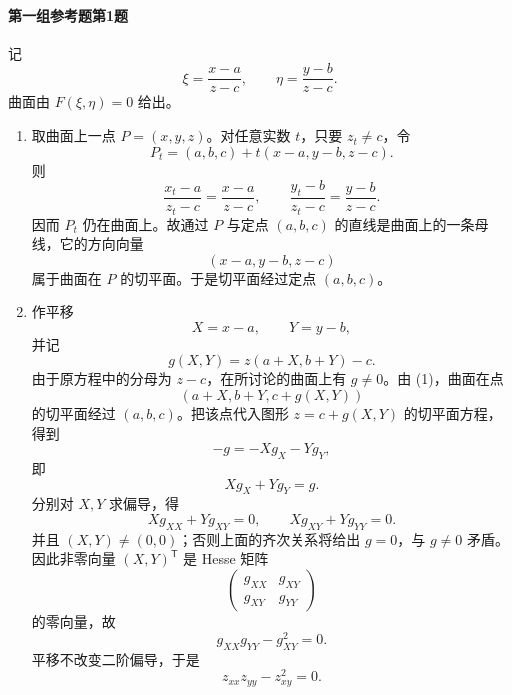 \paragraph{第一组参考题第1题}
\begin{xsolution}
记
\[
  \xi=\frac{x-a}{z-c},
  \qquad
  \eta=\frac{y-b}{z-c}.
\]
曲面由 $F(\xi,\eta)=0$ 给出。

\begin{enumerate}[label=(\arabic*)]
  \item 取曲面上一点 $P=(x,y,z)$。对任意实数 $t$，只要 $z_t\ne c$，令
  \[
    P_t=(a,b,c)+t(x-a,y-b,z-c).
  \]
  则
  \[
    \frac{x_t-a}{z_t-c}=\frac{x-a}{z-c},
    \qquad
    \frac{y_t-b}{z_t-c}=\frac{y-b}{z-c}.
  \]
  因而 $P_t$ 仍在曲面上。故通过 $P$ 与定点 $(a,b,c)$ 的直线是曲面上的一条母线，它的方向向量
  \[
    (x-a,y-b,z-c)
  \]
  属于曲面在 $P$ 的切平面。于是切平面经过定点 $(a,b,c)$。

  \item 作平移
  \[
    X=x-a,\qquad Y=y-b,
  \]
  并记
  \[
    g(X,Y)=z(a+X,b+Y)-c.
  \]
  由于原方程中的分母为 $z-c$，在所讨论的曲面上有 $g\ne0$。由 (1)，曲面在点
  \[
    (a+X,b+Y,c+g(X,Y))
  \]
  的切平面经过 $(a,b,c)$。把该点代入图形 $z=c+g(X,Y)$ 的切平面方程，得到
  \[
    -g=-Xg_X-Yg_Y,
  \]
  即
  \[
    Xg_X+Yg_Y=g.
  \]
  分别对 $X,Y$ 求偏导，得
  \[
    Xg_{XX}+Yg_{XY}=0,
    \qquad
    Xg_{XY}+Yg_{YY}=0.
  \]
  并且 $(X,Y)\ne(0,0)$；否则上面的齐次关系将给出 $g=0$，与 $g\ne0$ 矛盾。因此非零向量 $(X,Y)^{\mathsf T}$ 是 Hesse 矩阵
  \[
    \begin{pmatrix}g_{XX}&g_{XY}\\g_{XY}&g_{YY}\end{pmatrix}
  \]
  的零向量，故
  \[
    g_{XX}g_{YY}-g_{XY}^2=0.
  \]
  平移不改变二阶偏导，于是
  \[
    z_{xx}z_{yy}-z_{xy}^2=0.
  \]
\end{enumerate}
\end{xsolution}

